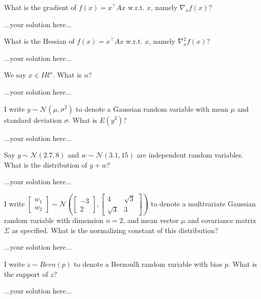 \documentclass[]{../util/ColumbiaAssm}
\newcommand{\reals}{I\!\!R} %
\begin{document}
\begin{questions}
\question[2] What is the gradient of $f(x) = x^\top A x$ w.r.t. $x$, namely $\nabla_x f(x)$?
\begin{solution}
...your solution here...
\end{solution}

\question[2] What is the Hessian of $f(x) = x^\top A x$ w.r.t. $x$, namely $\nabla^2_x f(x)$?
\begin{solution}
...your solution here...
\end{solution}

\question[2] We say $x \in \reals^n$.  What is $n$?
\begin{solution}
...your solution here...
\end{solution}


\question[2] I write $y \sim \mathcal{N}(\mu, \sigma^2)$ to denote a Gaussian random variable with mean $\mu$ and standard deviation $\sigma$.  What is $E(y^2)$?
\begin{solution}
...your solution here...
\end{solution}

\question[2] Say $y \sim \mathcal{N}(2.7, 8)$ and $w \sim \mathcal{N}(3.1, 15)$  are independent random variables.  What is the distribution of $y + w$?
\begin{solution}
...your solution here...
\end{solution}

\question[2] I write $\begin{bmatrix} w_1 \\ w_2 \end{bmatrix} \sim \mathcal{N}\left(  \begin{bmatrix} -3 \\ 2 \end{bmatrix}, \begin{bmatrix} 4 & \sqrt 3 \\ \sqrt 3 & 3 \end{bmatrix}\right)$ to denote a multivariate Gaussian random variable with dimension $n=2$, and mean vector $\mu$ and covariance matrix $\Sigma$ as specified.  What is the normalizing constant of this distribution?
\begin{solution}
...your solution here...
\end{solution}

\question[2] I write $z \sim Bern(p)$ to denote a Bernoulli random variable with bias $p$.  What is the support of $z$?
\begin{solution}
...your solution here...
\end{solution}


\end{questions}
\end{document}
